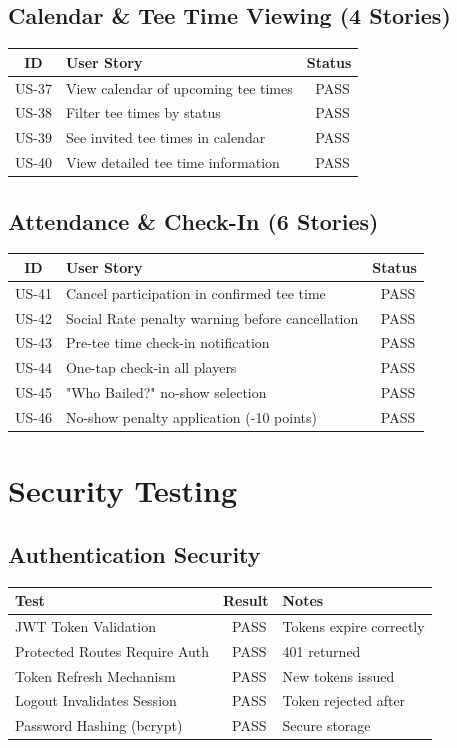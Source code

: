 \documentclass[11pt,a4paper]{article}
\newcommand{\pass}{\textcolor{pass}{\checkmark\ PASS}}
\begin{document}
\subsection{Calendar \& Tee Time Viewing (4 Stories)}
\begin{tabular}{|c|p{9cm}|c|}
\hline
\textbf{ID} & \textbf{User Story} & \textbf{Status} \\
\hline
US-37 & View calendar of upcoming tee times & \pass \\
\hline
US-38 & Filter tee times by status & \pass \\
\hline
US-39 & See invited tee times in calendar & \pass \\
\hline
US-40 & View detailed tee time information & \pass \\
\hline
\end{tabular}

\subsection{Attendance \& Check-In (6 Stories)}
\begin{tabular}{|c|p{9cm}|c|}
\hline
\textbf{ID} & \textbf{User Story} & \textbf{Status} \\
\hline
US-41 & Cancel participation in confirmed tee time & \pass \\
\hline
US-42 & Social Rate penalty warning before cancellation & \pass \\
\hline
US-43 & Pre-tee time check-in notification & \pass \\
\hline
US-44 & One-tap check-in all players & \pass \\
\hline
US-45 & "Who Bailed?" no-show selection & \pass \\
\hline
US-46 & No-show penalty application (-10 points) & \pass \\
\hline
\end{tabular}

\section{Security Testing}

\subsection{Authentication Security}
\begin{tabular}{|p{8cm}|c|p{4cm}|}
\hline
\textbf{Test} & \textbf{Result} & \textbf{Notes} \\
\hline
JWT Token Validation & \pass & Tokens expire correctly \\
\hline
Protected Routes Require Auth & \pass & 401 returned \\
\hline
Token Refresh Mechanism & \pass & New tokens issued \\
\hline
Logout Invalidates Session & \pass & Token rejected after \\
\hline
Password Hashing (bcrypt) & \pass & Secure storage \\
\hline
\end{tabular}
\end{document}
